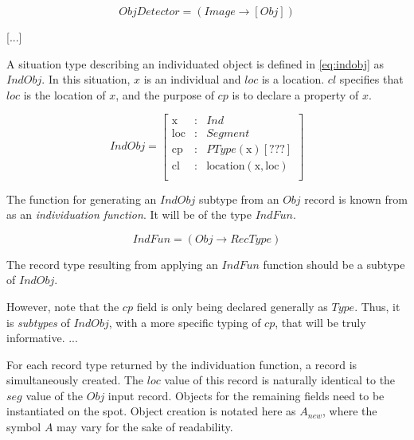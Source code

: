 \documentclass[11pt, a4paper]{article}
\begin{document}
\begin{equation}\label{eq:objdetector}
ObjDetector = ( Image \rightarrow [Obj] )
\end{equation}

[...]

A situation type describing an individuated object is defined in \autoref{eq:indobj} as $IndObj$.
In this situation, $x$ is an individual and $loc$ is a location.
$cl$ specifies that $loc$ is the location of $x$, and the purpose of $cp$ is to declare a property of $x$.

\begin{equation}\label{eq:indobj}
IndObj = \left[\begin{array}{rcl}
\text{x} &:& Ind \\
\text{loc} &:& Segment \\
\text{cp} &:& PType(\text{x}) [???] \\
\text{cl} &:& \text{location}(\text{x}, \text{loc}) \\
\end{array}\right]
\end{equation}

The function for generating an $IndObj$ subtype from an $Obj$ record is known from \cite{lspc} as an \textit{individuation function}.
It will be of the type $IndFun$.

\begin{equation}\label{eq:indfun}
IndFun = ( Obj \rightarrow RecType )
\end{equation}

The record type resulting from applying an $IndFun$ function should be a subtype of $IndObj$.

However, note that the $cp$ field is only being declared generally as $Type$.
Thus, it is \textit{subtypes} of $IndObj$, with a more specific typing of $cp$, that will be truly informative.
...

For each record type returned by the individuation function, a record is simultaneously created.
The $loc$ value of this record is naturally identical to the $seg$ value of the $Obj$ input record.
Objects for the remaining fields need to be instantiated on the spot.
Object creation is notated here as $A_{new}$, where the symbol $A$ may vary for the sake of readability.
\end{document}
